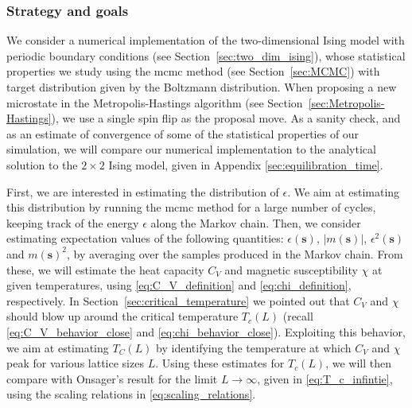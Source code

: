 \documentclass[english,notitlepage,reprint]{revtex4-2}  %
\renewcommand{\vec}[1]{\mathbf{#1}}
\begin{document}
\subsubsection{Strategy and goals}
We consider a numerical implementation of the two-dimensional Ising model with periodic boundary conditions (see Section~\ref{sec:two_dim_ising}), whose statistical properties we study using the \gls{mcmc} method (see Section~\ref{sec:MCMC}) with target distribution given by the Boltzmann distribution. 
When proposing a new microstate in the Metropolis-Hastings algorithm (see Section~\ref{sec:Metropolis-Hastings}), we use a single spin flip as the proposal move.
As a sanity check, and as an estimate of convergence of some of the statistical properties of our simulation, we will compare our numerical implementation to the analytical solution to the \(2\times 2\) Ising model, given in Appendix \ref{sec:equilibration_time}.

First, we are interested in estimating the distribution of $\epsilon$.
We aim at estimating this distribution by running the \gls{mcmc} method for a large number of cycles, keeping track of the energy \(\epsilon\) along the Markov chain.
Then, we consider estimating expectation values of the following quantities: \(\epsilon(\vec{s})\), \(|m(\vec{s})|\), \(\epsilon^2(\vec{s})\) and \(m(\vec{s})^2\), by averaging over the samples produced in the Markov chain.
From these, we will estimate the heat capacity \(C_V\) and magnetic susceptibility \(\chi\) at given temperatures, using \eqref{eq:C_V_definition} and \eqref{eq:chi_definition}, respectively.
In Section~\ref{sec:critical_temperature} we pointed out that \(C_V\) and \(\chi\) should blow up around the critical temperature \(T_c(L)\) (recall \eqref{eq:C_V_behavior_close} and \eqref{eq:chi_behavior_close}).
Exploiting this behavior, we aim at estimating \(T_C(L)\) by identifying the temperature at which \(C_V\) and \(\chi\) peak for various lattice sizes \(L\).
Using these estimates for \(T_c(L)\), we will then compare with Onsager's result for the limit \(L\rightarrow\infty\), given in \eqref{eq:T_c_infintie}, using the scaling relations in \eqref{eq:scaling_relations}.
\end{document}
